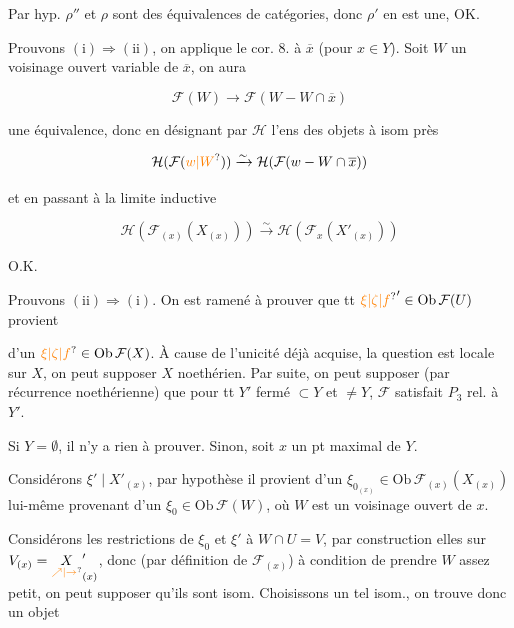 

Par hyp. $\rho''$ et $\rho$ sont des équivalences de catégories, donc $\rho'$ en est une, OK.

Prouvons $(\mathrm{i})\Rightarrow(\mathrm{ii})$, on applique le cor. 8. à $\overline x$ (pour $x\in Y$). Soit $W$ un voisinage ouvert variable de $\overline x$, on aura

\[
\mathcal F(W)\longrightarrow\mathcal F(W-W\cap\overline x)
\]

une équivalence, donc  en désignant par $\mathcal H$ l'ens des objets à isom près

\[
\mathcal H(\mathcal F(\unsure{w|W}))\xrightarrow{\sim}\mathcal H(\mathcal F(w-W\cap\overline x))
\]

et en passant à la limite inductive

\[
\mathcal H(\mathcal F_{(x)}(X_{(x)}))\xrightarrow{\sim}
\mathcal H(\mathcal F_x(X'_{(x)}))
\]

O.K.

Prouvons $(\mathrm{ii})\Rightarrow(\mathrm{i})$. On est ramené à prouver que tt $\unsure{\xi|\zeta|f}'\in\mathrm{Ob}\,\mathcal F(U)$ provient


d'un $\unsure{\xi|\zeta|f}\in\mathrm{Ob}\,\mathcal F(X)$. À cause de l'unicité déjà acquise, la question est locale sur $X$, on peut supposer $X$ noethérien. Par suite, on peut supposer  (par récurrence noethérienne) que pour tt $Y'$ fermé $\subset Y$ et $\ne Y$,  $\mathcal F$ satisfait $P_3$ rel. à $Y'$.

 Si  $Y=\emptyset$, il n'y a rien à prouver. Sinon, soit $x$ un pt maximal de $Y$.

Considérons $\xi'\mid X'_{(x)}$, par hypothèse il provient d'un $\xi_{0_{(x)}}\in\mathrm{Ob}\,\mathcal F_{(x)}(X_{(x)})$ lui-même provenant d'un $\xi_0\in\mathrm{Ob}\,\mathcal F(W)$, où $W$ est un voisinage  ouvert de $x$.

 Considérons les restrictions de $\xi_0$ et $\xi'$ à $W\cap U=V$, par construction elles   sur $V_{(x)}=\underset{\unsure{\nearrow|\to}}{X}'_{(x)}$, donc (par définition de $\mathcal F_{(x)}$) à condition de prendre $W$ assez petit, on peut supposer qu'ils sont isom. Choisissons un tel isom., on trouve donc un objet

